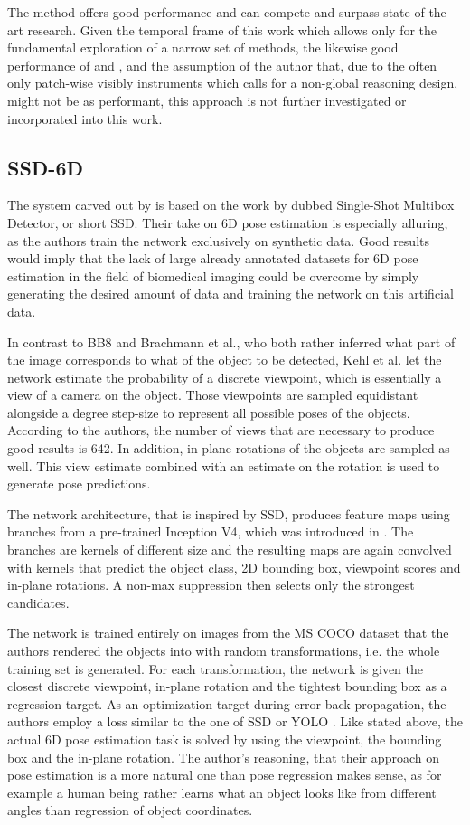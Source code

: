 The method offers good performance and can compete and surpass state-of-the-art research. Given the temporal frame of this work which allows only for the fundamental exploration of a narrow set of methods, the likewise good performance of \cite{brachmann2} and \cite{pertsch}, and the assumption of the author that, due to the often only patch-wise visibly instruments which calls for a non-global reasoning design, \cite{bb8} might not be as performant, this approach is not further investigated or incorporated into this work.

\subsection{SSD-6D}

The system carved out by \cite{ssd-6d} is based on the work by \cite{ssd} dubbed Single-Shot Multibox Detector, or short SSD. Their take on 6D pose estimation is especially alluring, as the authors train the network exclusively on synthetic data. Good results would imply that the lack of large already annotated datasets for 6D pose estimation in the field of biomedical imaging could be overcome by simply generating the desired amount of data and training the network on this artificial data. 

In contrast to BB8 and Brachmann et al., who both rather inferred what part of the image corresponds to what of the object to be detected, Kehl et al. let the network estimate the probability of a discrete viewpoint, which is essentially a view of a camera on the object. Those viewpoints are sampled equidistant alongside a degree step-size to represent all possible poses of the objects. According to the authors, the number of views that are necessary to produce good results is 642. In addition, in-plane rotations of the objects are sampled as well. This view estimate combined with an estimate on the rotation is used to generate pose predictions. 

The network architecture, that is inspired by SSD, produces feature maps using branches from a pre-trained Inception V4, which was introduced in \cite{inceptionv4}. The branches are kernels of different size and the resulting maps are again convolved with kernels that predict the object class, 2D bounding box, viewpoint scores and in-plane rotations. A non-max suppression then selects only the strongest candidates. 

The network is trained entirely on images from the MS COCO dataset \cite{mscoco} that the authors rendered the objects into with random transformations, i.e. the whole training set is generated. For each transformation, the network is given the closest discrete viewpoint, in-plane rotation and the tightest bounding box as a regression target. As an optimization target during error-back propagation, the authors employ a loss similar to the one of SSD \cite{ssd} or YOLO \cite{yolo}. Like stated above, the actual 6D pose estimation task is solved by using the viewpoint, the bounding box and the in-plane rotation. The author's reasoning, that their approach on pose estimation is a more natural one than pose regression makes sense, as for example a human being rather learns what an object looks like from different angles than regression of object coordinates. 

